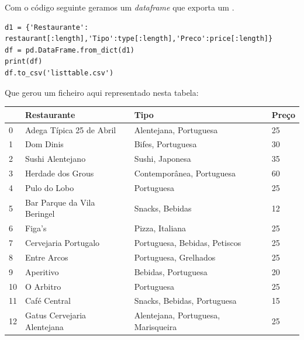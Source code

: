 \documentclass[a4paper,10pt]{article}
\begin{document}
Com o código seguinte geramos um \textit{dataframe} que exporta um .

\begin{verbatim}
d1 = {'Restaurante': restaurant[:length],'Tipo':type[:length],'Preco':price[:length]}
df = pd.DataFrame.from_dict(d1)
print(df)
df.to_csv('listtable.csv')
\end{verbatim}

Que gerou um ficheiro aqui representado nesta tabela:

\begin{table}[!ht]
  \centering
  \begin{tabular}{|l|l|l|l|}
    \hline
    ~      & Restaurante                 & Tipo                                & Preço  \\ \hline
    0      & Adega Típica 25 de Abril    & Alentejana, Portuguesa              & 25     \\ \hline
    1      & Dom Dinis                   & Bifes, Portuguesa                   & 30     \\ \hline
    2      & Sushi Alentejano            & Sushi, Japonesa                     & 35     \\ \hline
    3      & Herdade dos Grous           & Contemporânea, Portuguesa           & 60     \\ \hline
    4      & Pulo do Lobo                & Portuguesa                          & 25     \\ \hline
    5      & Bar Parque da Vila Beringel & Snacks, Bebidas                     & 12     \\ \hline
    6      & Figa's                      & Pizza, Italiana                     & 25     \\ \hline
    7      & Cervejaria Portugalo        & Portuguesa, Bebidas, Petiscos       & 25     \\ \hline
    8      & Entre Arcos                 & Portuguesa, Grelhados               & 25     \\ \hline
    9      & Aperitivo                   & Bebidas, Portuguesa                 & 20     \\ \hline
    10     & O Arbitro                   & Portuguesa                          & 25     \\ \hline
    11     & Café Central                & Snacks, Bebidas, Portuguesa         & 15     \\ \hline
    12     & Gatus Cervejaria Alentejana & Alentejana, Portuguesa, Marisqueira & 25     \\ \hline

\end{tabular}
\end{table}
\end{document}
